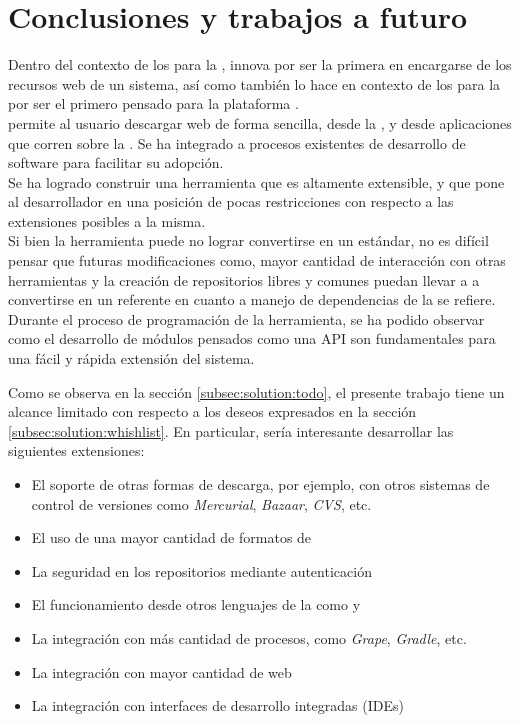 \section{Conclusiones y trabajos a futuro}
\label{sec:futurework}

Dentro del contexto de los \depmgrs para la \jvm, \fronttier innova por 
ser la primera en encargarse de los recursos web de un sistema, así como 
también lo hace en contexto de los \depmgrs para la \viewtier por ser el 
primero pensado para la plataforma \java.\\
\fronttier permite al usuario descargar \dependencies web de forma sencilla, 
desde la \cli, y desde aplicaciones que corren sobre la \jvm. Se 
ha integrado a procesos existentes de desarrollo de software para facilitar su 
adopción.\\
Se ha logrado construir una herramienta que es altamente extensible, y que pone 
al desarrollador en una posición de pocas restricciones con respecto a las 
extensiones posibles a la misma.\\
Si bien la herramienta puede no lograr convertirse en un estándar, no es 
difícil pensar que futuras modificaciones como, mayor cantidad de interacción 
con otras herramientas y la creación de repositorios libres y comunes puedan 
llevar a \fronttier a convertirse en un referente en cuanto a manejo de 
dependencias de la \viewtier se refiere.\\
Durante el proceso de programación de la herramienta, se ha podido observar 
como el desarrollo de módulos pensados como una API son fundamentales para una 
fácil y rápida extensión del sistema.\\

\jump[2]

Como se observa en la sección \ref{subsec:solution:todo}, el presente trabajo 
tiene un alcance limitado con respecto a los deseos expresados en la sección 
\ref{subsec:solution:whishlist}. En particular, sería interesante desarrollar 
las siguientes extensiones:

\begin{itemize}
	\setlength{\itemsep}{1pt}
	\setlength{\parskip}{0pt}
	\setlength{\parsep}{0pt}
	\item El soporte de otras formas de descarga, por ejemplo, con otros 
		sistemas de control de versiones como \emph{Mercurial}, \emph{Bazaar}, 
		\emph{CVS}, etc.
	\item El uso de una mayor cantidad de formatos de \conffiles
	\item La seguridad en los repositorios mediante autenticación
	\item El funcionamiento desde otros lenguajes de la \jvm como \clojure y 
	\groovy
	\item La integración con más cantidad de procesos, como \emph{Grape}, 
		\emph{Gradle}, etc.
	\item La integración con mayor cantidad de \frameworks web
	\item La integración con interfaces de desarrollo integradas (IDEs)
\end{itemize}

